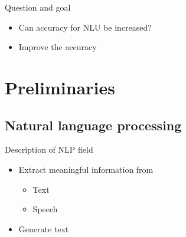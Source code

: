 \documentclass[pdf]{beamer}
\begin{document}
\begin{frame}{Question and goal}
  \begin{itemize}
  \item Can accuracy for NLU be increased?
  \item Improve the accuracy
  \end{itemize}
\end{frame}


\section{Preliminaries}
\subsection{Natural language processing}
\begin{frame}{Description of NLP field}
\begin{itemize}
\item Extract meaningful information from
  \begin{itemize}
  \item Text
    \item Speech
  \end{itemize}
\item Generate text
\end{itemize}
\end{frame}
\end{document}
